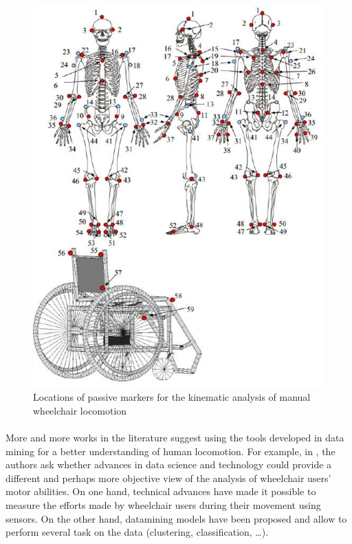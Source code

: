\begin{itemize}
\begin{figure}[h]
\center
\includegraphics[scale = 0.5]{images/squelette}
\caption{Locations of passive markers for the kinematic analysis of manual wheelchair locomotion \cite{Sauret2010}}
\label{Wheelchair_model2}
\end{figure}

\end{itemize}


\paragraph{} More and more works in the literature suggest using the tools developed in data mining for a better understanding of human locomotion. For example, in \cite{van2017future}, the authors ask whether advances in data science and technology could provide a different and perhaps more objective view of the analysis of wheelchair users' motor abilities. On one hand, technical advances have made it possible to measure the efforts made by wheelchair users during their movement using sensors. On the other hand, datamining models have been proposed and allow to perform several task on the data (clustering, classification, …). 

